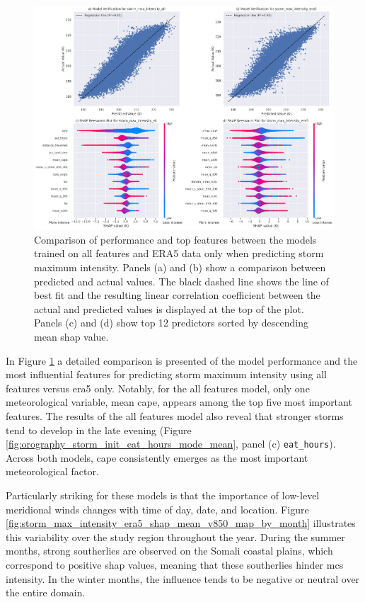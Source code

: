 \begin{figure}[ht]
    \centering
    \includegraphics[width=\textwidth]{../figures/generated/experiments/storm_max_intensity/storm_max_intensity_summary.png}
    \caption{Comparison of performance and top features between the models trained on all features and ERA5 data only when predicting storm maximum intensity. Panels (a) and (b) show a comparison between predicted and actual values. The black dashed line shows the line of best fit and the resulting linear correlation coefficient between the actual and predicted values is displayed at the top of the plot. Panels (c) and (d) show top 12 predictors sorted by descending mean \acrshort{shap} value.}
    \label{fig:storm_max_intensity_summary}
\end{figure}

In Figure \ref{fig:storm_max_intensity_summary} a detailed comparison is presented of the model performance and the most influential features for predicting storm maximum intensity using all features versus \acrshort{era5} only. Notably, for the all features model, only one meteorological variable, mean \acrshort{cape}, appears among the top five most important features. The results of the all features model also reveal that stronger storms tend to develop in the late evening (Figure \ref{fig:orography_storm_init_eat_hours_mode_mean}, panel (c) \texttt{eat\_hours}). Across both models, \acrshort{cape} consistently emerges as the most important meteorological factor.

Particularly striking for these models is that the importance of low-level meridional winds changes with time of day, date, and location. Figure \ref{fig:storm_max_intensity_era5_shap_mean_v850_map_by_month} illustrates this variability over the study region throughout the year. During the summer months, strong southerlies are observed on the Somali coastal plains, which correspond to positive \acrshort{shap} values, meaning that these southerlies hinder \acrshort{mcs} intensity. In the winter months, the influence tends to be negative or neutral over the entire domain.


